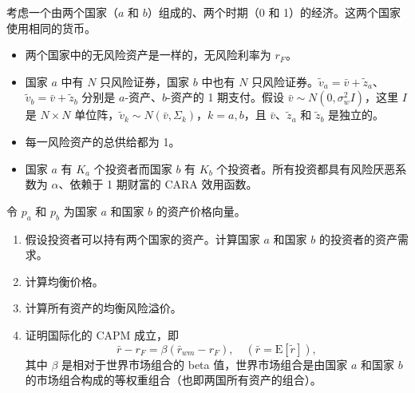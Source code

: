 \begin{problem}
 考虑一个由两个国家（$a$ 和 $b$）组成的、两个时期（0 和 1）的经济。这两个国家使用相同的货币。
\begin{itemize}
    \item 两个国家中的无风险资产是一样的，无风险利率为 $r_{F}$。
    \item 国家 $a$ 中有 $N$ 只风险证券，国家 $b$ 中也有 $N$ 只风险证券。$\tilde{v}_{a}=\bar{v}+\tilde{z}_{a}$、$\tilde{v}_{b}=\bar{v}+\tilde{z}_{b}$ 分别是 $a$-资产、$b$-资产的 1 期支付。假设 $\bar{v}\sim N(0,\sigma_{w}^{2}I)$，这里 $I$ 是 $N\times N$ 单位阵，$\tilde{v}_{k}\sim N(\bar{v},\Sigma_{k})$，$k=a,b$，且 $\bar{v}$、$\tilde{z}_{a}$ 和 $\tilde{z}_{b}$ 是独立的。
    \item 每一风险资产的总供给都为 1。
    \item 国家 $a$ 有 $K_{a}$ 个投资者而国家 $b$ 有 $K_{b}$ 个投资者。所有投资都具有风险厌恶系数为 $\alpha$、依赖于 1 期财富的 CARA 效用函数。
\end{itemize}
令 $p_{a}$ 和 $p_{b}$ 为国家 $a$ 和国家 $b$ 的资产价格向量。
\begin{enumerate}[label=(\alph*)]
    \item 假设投资者可以持有两个国家的资产。计算国家 $a$ 和国家 $b$ 的投资者的资产需求。
    \item 计算均衡价格。
    \item 计算所有资产的均衡风险溢价。
    \item 证明国际化的 CAPM 成立，即
    \[
        \bar{r}-r_{F}=\beta(\bar{r}_{wm}-r_{F}),\quad(\bar{r}=\mathrm{E}[\tilde{r}]),
    \]
    其中 $\beta$ 是相对于世界市场组合的 beta 值，世界市场组合是由国家 $a$ 和国家 $b$ 的市场组合构成的等权重组合（也即两国所有资产的组合）。
\end{enumerate}
\end{problem}
